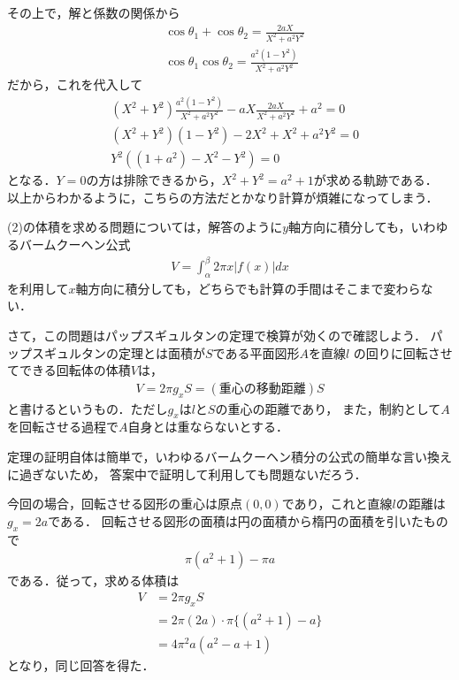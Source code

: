 \documentclass[a4paper,10pt]{ltjsarticle}
\begin{document}
\begin{multicols}{2}
  その上で，解と係数の関係から
  \begin{align}
     & \cos\theta_1 + \cos\theta_2 = \frac{2aX}{X^2+a^2Y^2}                   \\
     & \cos\theta_1\cos\theta_2    = \frac{a^2\left(1-Y^2\right)}{X^2+a^2Y^2}
  \end{align}
  だから，これを代入して
  \begin{align*}
     & \left(X^2+Y^2\right)\frac{a^2\left(1-Y^2\right)}{X^2+a^2Y^2} -aX\frac{2aX}{X^2+a^2Y^2} + a^2 = 0 \\
     & \left(X^2+Y^2\right)\left(1-Y^2\right) -2X^2 + X^2+a^2Y^2 = 0                                    \\
     & Y^2\left((1+a^2) - X^2-Y^2\right) = 0
  \end{align*}
  となる．$Y=0$の方は排除できるから，$X^2+Y^2=a^2+1$が求める軌跡である．
  以上からわかるように，こちらの方法だとかなり計算が煩雑になってしまう．

  \vspace{10pt}
  (2)の体積を求める問題については，解答のように$y$軸方向に積分しても，いわゆるバームクーヘン公式
  \begin{align*}
    V = \int_{\alpha}^{\beta} 2\pi x |f(x)| dx
  \end{align*}
  を利用して$x$軸方向に積分しても，どちらでも計算の手間はそこまで変わらない．

  さて，この問題はパップスギュルタンの定理で検算が効くので確認しよう．
  パップスギュルタンの定理とは面積が$S$である平面図形$A$を直線$l$ の回りに回転させてできる回転体の体積$V$は，
  \begin{align*}
    V=2\pi g_x S = (\text{重心の移動距離}) S
  \end{align*}
  と書けるというもの．ただし$g_x$は$l$と$S$の重心の距離であり，
  また，制約として$A$を回転させる過程で$A$自身とは重ならないとする．

  定理の証明自体は簡単で，いわゆるバームクーヘン積分の公式の簡単な言い換えに過ぎないため，
  答案中で証明して利用しても問題ないだろう．

  今回の場合，回転させる図形の重心は原点$(0,0)$であり，これと直線$l$の距離は$g_x =2a$である．
  回転させる図形の面積は円の面積から楕円の面積を引いたもので
  \begin{align*}
    \pi(a^2+1) - \pi a
  \end{align*}
  である．従って，求める体積は
  \begin{align*}
    V
     & = 2\pi g_x S                        \\
     & = 2\pi (2a) \cdot \pi \{(a^2+1)-a\} \\
     & = 4\pi^2 a(a^2-a+1)
  \end{align*}
  となり，同じ回答を得た．

  \newpage
\end{multicols}
\end{document}
